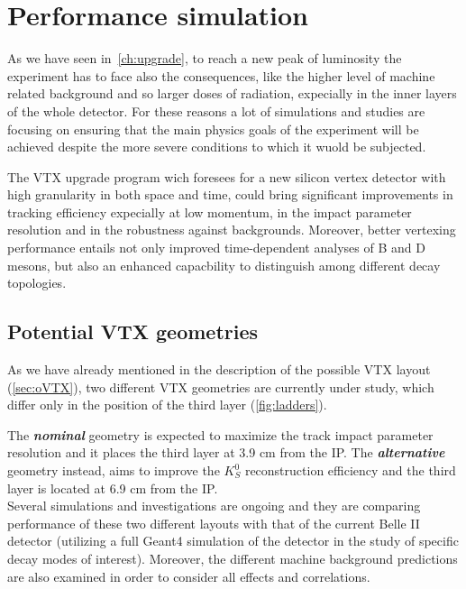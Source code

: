\section{Performance simulation}


As we have seen in~\autoref{ch:upgrade}, to reach a new peak of luminosity the experiment has to face also the consequences, like the higher level of machine related background and so larger doses of radiation, expecially in the inner layers of the whole detector. 
For these reasons a lot of simulations and studies are focusing on ensuring that the main physics goals of the experiment will be achieved despite the more severe conditions to which it wuold be subjected. 

The VTX upgrade program wich foresees for a new silicon vertex detector with high granularity in both space and time, could bring significant improvements in tracking efficiency expecially at low momentum, in the impact parameter resolution and in the robustness against backgrounds. Moreover, better vertexing performance entails not only improved time-dependent analyses of B and D mesons, but also an enhanced capacbility to distinguish among different decay topologies.


\subsection{Potential VTX geometries}

As we have already mentioned in the description of the possible VTX layout (\autoref{sec:oVTX}), two different VTX geometries are currently under study, which differ only in the position of the third layer (\autoref{fig:ladders}).  

The \textit{\textbf{nominal}} geometry is expected to maximize the track impact parameter resolution and it places the third layer at 3.9 cm from the IP.
The \textit{\textbf{alternative}} geometry instead, aims to improve the $K_{S}^{0}$ reconstruction efficiency and the third layer is located at 6.9 cm from the IP.\\

Several simulations and investigations are ongoing and they are comparing performance of these two different layouts with that of the current Belle II detector (utilizing a full Geant4 simulation of the detector in the study of specific decay modes of interest). Moreover, the different machine background predictions are also examined in order to consider all effects and correlations. 

